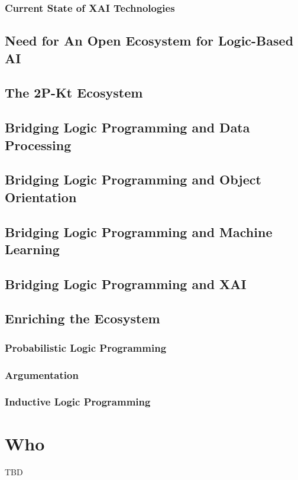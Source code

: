 \documentclass[12pt,a4paper,openright,twoside]{book}
\begin{document}
\section{Current State of XAI Technologies}

\chapter{Need for An Open Ecosystem for Logic-Based AI}

\chapter{The 2P-Kt Ecosystem}

\chapter{Bridging Logic Programming and Data Processing}

\chapter{Bridging Logic Programming and Object Orientation}

\chapter{Bridging Logic Programming and Machine Learning}

\chapter{Bridging Logic Programming and XAI}

\chapter{Enriching the Ecosystem}

\section{Probabilistic Logic Programming}

\section{Argumentation}

\section{Inductive Logic Programming}

\part{Who}
\label{part:who}

TBD


\nocite{*} %


\end{document}

